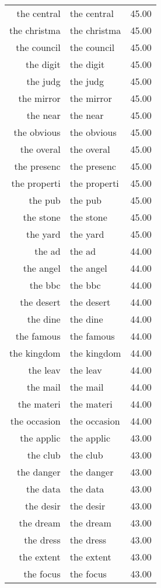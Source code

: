 \begin{table}[ht]
\begin{tabular}{rlr}
  the central & the central & 45.00 \\ 
  the christma & the christma & 45.00 \\ 
  the council & the council & 45.00 \\ 
  the digit & the digit & 45.00 \\ 
  the judg & the judg & 45.00 \\ 
  the mirror & the mirror & 45.00 \\ 
  the near & the near & 45.00 \\ 
  the obvious & the obvious & 45.00 \\ 
  the overal & the overal & 45.00 \\ 
  the presenc & the presenc & 45.00 \\ 
  the properti & the properti & 45.00 \\ 
  the pub & the pub & 45.00 \\ 
  the stone & the stone & 45.00 \\ 
  the yard & the yard & 45.00 \\ 
  the ad & the ad & 44.00 \\ 
  the angel & the angel & 44.00 \\ 
  the bbc & the bbc & 44.00 \\ 
  the desert & the desert & 44.00 \\ 
  the dine & the dine & 44.00 \\ 
  the famous & the famous & 44.00 \\ 
  the kingdom & the kingdom & 44.00 \\ 
  the leav & the leav & 44.00 \\ 
  the mail & the mail & 44.00 \\ 
  the materi & the materi & 44.00 \\ 
  the occasion & the occasion & 44.00 \\ 
  the applic & the applic & 43.00 \\ 
  the club & the club & 43.00 \\ 
  the danger & the danger & 43.00 \\ 
  the data & the data & 43.00 \\ 
  the desir & the desir & 43.00 \\ 
  the dream & the dream & 43.00 \\ 
  the dress & the dress & 43.00 \\ 
  the extent & the extent & 43.00 \\ 
  the focus & the focus & 43.00 \\ 

\end{tabular}
\end{table}
